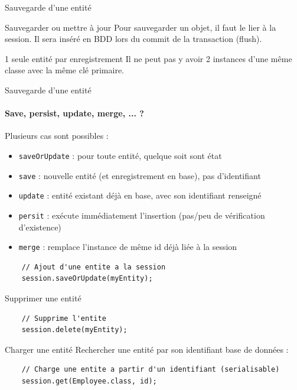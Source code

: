 \documentclass[compress]{beamer}%
\begin{document}
\begin{frame}{Sauvegarde d'une entité}
 	
 	\begin{block}{Sauvegarder ou mettre à jour}
	Pour sauvegarder un objet, il faut le lier à la session. Il sera inséré en BDD lors du commit de la transaction (flush).
	\end{block}
	
	\pause
	\begin{alertblock}{1 seule entité par enregistrement}
	Il ne peut pas y avoir 2 instances d'une même classe avec la même clé primaire.
	\end{alertblock}
	
\end{frame}

\begin{frame}[fragile]{Sauvegarde d'une entité}
 	\framesubtitle{Save, persist, update, merge, ... ?}
 	
	Plusieurs cas sont possibles :
	\begin{itemize}[<+->]
	\item \texttt{saveOrUpdate} : pour toute entité, quelque soit sont état
	\item \texttt{save} : nouvelle entité (et enregistrement en base), pas d'identifiant
	\item \texttt{update} : entité existant déjà en base, avec son identifiant renseigné 
	\item \texttt{persit} : exécute immédiatement l'insertion (pas/peu de vérification d'existence) 
	\item \texttt{merge} : remplace l'instance de même id déjà liée à la session
	\end{itemize}
	
	\begin{lstlisting}
	// Ajout d'une entite a la session
	session.saveOrUpdate(myEntity);
	\end{lstlisting}
	
\end{frame}

\begin{frame}[fragile]{Supprimer une entité}
	
	\begin{lstlisting}
	// Supprime l'entite
	session.delete(myEntity);
	\end{lstlisting}
\end{frame}


\begin{frame}[fragile]{Charger une entité}
	Rechercher une entité par son identifiant base de données :
	\begin{lstlisting}
	// Charge une entite a partir d'un identifiant (serialisable)
	session.get(Employee.class, id);
	\end{lstlisting}
\end{frame}
	
\end{document}
